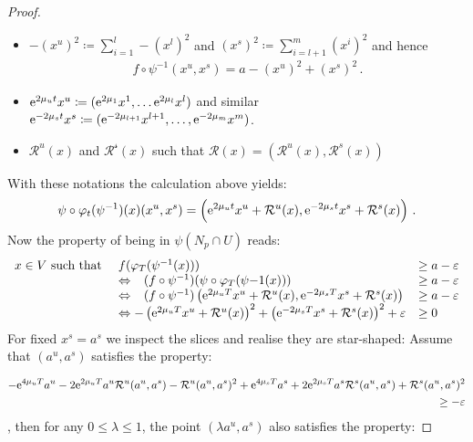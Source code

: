 \begin{proof}
\begin{itemize}
\item $-(x^{u})^2\coloneq \sum _{i=1}^l-(x^l)^2$ and $(x^{s})^2\coloneq \sum_{i=l+1}^m (x^i)^2$ and hence 
\begin{align*}
	f\circ\psi^{-1}(x^u,x^s)=a-(x^{u})^2+(x^{s})^2\, .
\end{align*} 
\item  $\mathrm{e}^{2\mu_u t}x^u\coloneq(\mathrm{e}^{2\mu_{1}}x^1,\dots \mathrm{e}^{2\mu_{l}}x^l)$ and similar $\mathrm{e}^{-2\mu_s t }x^s\coloneq (\mathrm{e}^{-2\mu_{l+1}}x^{l+1},\dots,\mathrm{e}^{-2\mu_{m}}x^m)$.
\item $\mathcal{R}^u(x)$ and $\mathcal{R^s}(x)$ such that $\mathcal{R}(x)=\left(\mathcal{R}^u(x),\mathcal{R}^s(x)\right)$
\end{itemize} With these notations the calculation above yields:
\begin{align*}
\psi\circ \varphi_t(\psi^{-1})(x)(x^u,x^s)=\left(\mathrm{e}^{2\mu_ut}x^u+\mathcal{R}^u(x),\mathrm{e}^{-2\mu_st}x^s+\mathcal{R}^s(x)\right)\, .
\end{align*}
Now the property of being in $\psi(N_p\cap U)$ reads:
\begin{align*}
	\begin{array}{lll}
		x\in V \text{ such that } & f(\varphi_T (\psi^{-1}(x))) & \geq a-\varepsilon \\
		&\Leftrightarrow \phantom{-} (f\circ \psi^{-1})(\psi\circ \varphi_T (\psi{-1}(x)))& \geq a-\varepsilon \\
		&\Leftrightarrow  \phantom{-}(f\circ \psi^{-1})\left(\mathrm{e}^{2\mu_uT}x^u+\mathcal{R}^u(x),\mathrm{e}^{-2\mu_sT}x^s+\mathcal{R}^s(x)\right)&\geq a-\varepsilon \\
		&\Leftrightarrow -\left(\mathrm{e}^{2\mu_uT}x^u+\mathcal{R}^u(x)\right)^2    
		+\left(\mathrm{e}^{-2\mu_sT}x^s+\mathcal{R}^s(x)\right)^2+\varepsilon &\geq 0
	\end{array}
\end{align*} 
For fixed $x^s=a^s$ we inspect the slices and realise they are star-shaped: Assume that $(a^u,a^s)$ satisfies the property:

\begin{align*}
	-\mathrm{e}^{4\mu_uT}a^u	-2\mathrm{e}^{2\mu_uT}a^u	\mathcal{R}^u(a^u,a^s)	-\mathcal{R}^u(a^u,a^s)^2
	+\mathrm{e}^{4\mu_sT}a^s	+2\mathrm{e}^{2\mu_sT}a^s	\mathcal{R}^s(a^u,a^s)	+\mathcal{R}^s(a^u,a^s)^2 \\
	\geq -\varepsilon
\end{align*}
, then for any $0\leq \lambda \leq 1$, the point $(\lambda a^u,a^s)$ also satisfies the property:



\end{proof}
